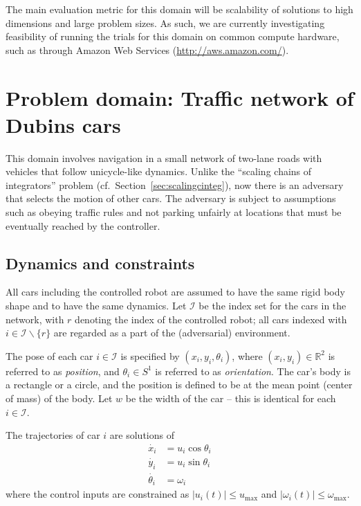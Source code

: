 \documentclass{amsart}
\theoremstyle{definition}
\begin{document}
The main evaluation metric for this domain will be scalability of solutions to
high dimensions and large problem sizes. As such, we are currently investigating
feasibility of running the trials for this domain on common compute hardware,
such as through Amazon Web Services (\url{http://aws.amazon.com/}).


\section{Problem domain: Traffic network of Dubins cars}\label{sec:trafficdubins}

This domain involves navigation in a small network of two-lane roads with
vehicles that follow unicycle-like dynamics. Unlike the ``scaling
chains of integrators'' problem (cf.\ Section~\ref{sec:scalingcinteg}), now
there is an adversary that selects the motion of other cars.  The adversary is
subject to assumptions such as obeying traffic rules and not parking unfairly at
locations that must be eventually reached by the controller.

\subsection{Dynamics and constraints}
All cars including the controlled robot are assumed to have the same rigid body
shape and to have the same dynamics. Let $\mathcal I$ be the index set for the
cars in the network, with $r$ denoting the index of the controlled robot; all
cars indexed with $i \in {\mathcal I}\backslash\{r\}$ are regarded as a part of
the (adversarial) environment.

The pose of each car $i \in {\mathcal I}$ is specified by $(x_i,y_i,\theta_i)$,
where $(x_i,y_i)\in \mathbb{R}^2$ is referred to as \textit{position}, and
$\theta_i \in S^1$ is referred to as \textit{orientation}.  The car's body is a
rectangle or a circle, and the position is defined to be at the mean point
(center of mass) of the body.  Let $w$ be the width of the car -- this is
identical for each $i \in {\mathcal I}$.

The trajectories of car $i$ are solutions of
\begin{align}
\dot{x_i} &= u_i \cos \theta_i \\
\dot{y_i} &= u_i \sin \theta_i \\
\dot{\theta_i} &= \omega_i
\end{align}
where the control inputs are constrained as $\lvert u_i(t) \rvert \leq u_{\mathrm{max}}$ and
$\lvert\omega_i(t)\rvert \leq \omega_{\mathrm{max}}$.
\end{document}
